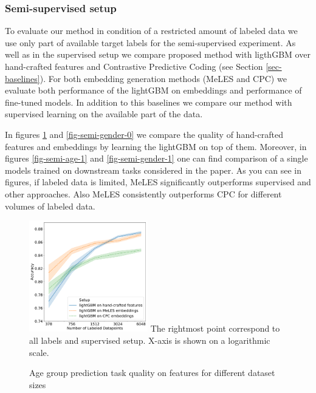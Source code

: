 \documentclass[sigconf, anonymous]{acmart}
\begin{document}
\subsubsection{Semi-supervised setup} \label{sec-semi}

To evaluate our method in condition of a restricted amount of labeled data we use only part of available target labels for the semi-supervised experiment.
As well as in the supervised setup we compare proposed method with ligthGBM over hand-crafted features and Contrastive Predictive Coding (see Section \ref{sec-baselines}).
For both embedding generation methods (MeLES and CPC) we evaluate both performance of the lightGBM on embeddings and performance of fine-tuned models.
In addition to this baselines we compare our method with supervised learning on the available part of the data.

In figures \ref{fig-semi-age-0} and \ref{fig-semi-gender-0} we compare the quality of hand-crafted features and embeddings by learning the lightGBM on top of them. Moreover, in figures \ref{fig-semi-age-1} and \ref{fig-semi-gender-1} one can find comparison of a single models trained on downstream tasks considered in the paper. As you can see in figures, if labeled data is limited, MeLES significantly outperforms supervised and other approaches. Also MeLES consistently outperforms CPC for different volumes of labeled data.

\begin{figure}[h]
  \caption{Age group prediction task quality on features for different dataset sizes}
  \includegraphics[width=0.46\textwidth]{figures/ss_age_0.pdf}
  \small{The rightmost point correspond to all labels and supervised setup. X-axis is shown on a logarithmic scale.}
  \label{fig-semi-age-0}
\end{figure}
\end{document}
